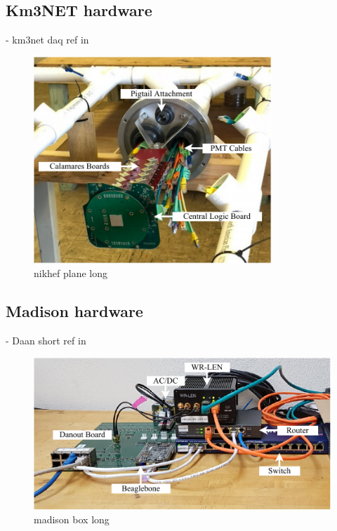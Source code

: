 \subsection{Km3NET hardware} %
\label{sec:daq_hard_km3net} %

- km3net daq ref in~\cite{biagi2015, adrian2016, eijk2015}

\begin{figure} %
    \includegraphics[width=0.8\textwidth]{diagrams/5-daq/nikhef_plane.pdf}
    \caption[nikhef plane short]
    {nikhef plane long}
    \label{fig:nikhef_plane}
\end{figure}

\subsection{Madison hardware} %
\label{sec:daq_hard_madison} %

- Daan short ref in~\cite{eijk2018}

\begin{figure} %
    \includegraphics[width=\textwidth]{diagrams/5-daq/madison_box.pdf}
    \caption[madison box short]
    {madison box long}
    \label{fig:madison_box}
\end{figure}

